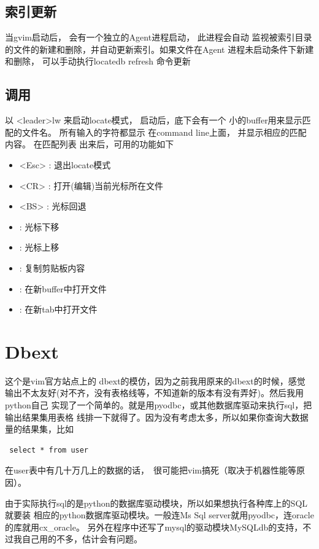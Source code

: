 \documentclass[oneside,openany]{book}
\begin{document}
\subsection{索引更新}
    当gvim启动后， 会有一个独立的Agent进程启动， 此进程会自动 
监视被索引目录的文件的新建和删除，并自动更新索引。如果文件在Agent
进程未启动条件下新建和删除， 可以手动执行locatedb refresh 命令更新

\subsection{调用}
   以 <leader>lw 来启动locate模式， 启动后，底下会有一个
 小的buffer用来显示匹配的文件名。 所有输入的字符都显示
 在command line上面， 并显示相应的匹配内容。 在匹配列表
 出来后，可用的功能如下
    \begin{itemize}
        \item <Esc> : 退出locate模式
        \item <CR>  : 打开(编辑)当前光标所在文件 
        \item <BS>  : 光标回退
        \item <C-j> : 光标下移
        \item <C-k> : 光标上移
        \item <C-v> : 复制剪贴板内容
        \item <C-b> : 在新buffer中打开文件
        \item <C-t> : 在新tab中打开文件
    \end{itemize}
    

\section{Dbext}

  这个是vim官方站点上的 dbext的模仿，因为之前我用原来的dbext的时候，感觉
输出不太友好(对不齐，没有表格线等，不知道新的版本有没有弄好)。然后我用python自己
实现了一个简单的。就是用pyodbc，或其他数据库驱动来执行sql，把输出结果集用表格
线排一下就得了。因为没有考虑太多，所以如果你查询大数据量的结果集，比如 
\begin{verbatim} select * from user \end{verbatim}
在user表中有几十万几上的数据的话，　很可能把vim搞死（取决于机器性能等原因）。

由于实际执行sql的是python的数据库驱动模块，所以如果想执行各种库上的SQL就要装
相应的python数据库驱动模块。一般连Ms Sql server就用pyodbc，连oracle的库就用cx\_oracle。
另外在程序中还写了mysql的驱动模块MySQLdb的支持，不过我自己用的不多，估计会有问题。
\end{document}
